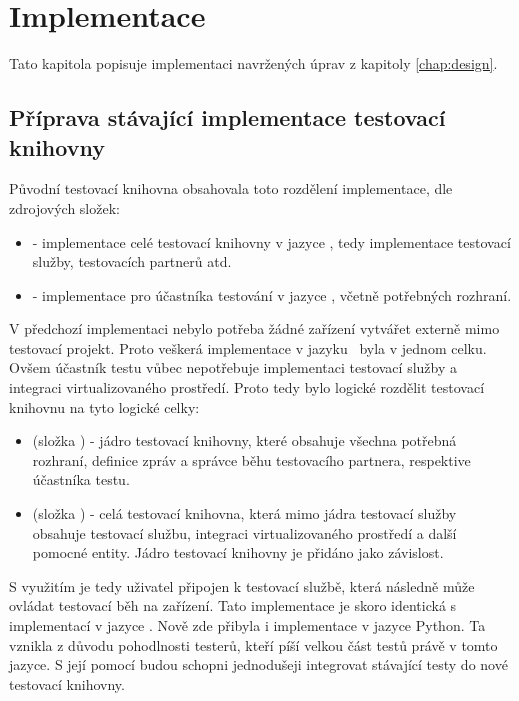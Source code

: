 \chapter{Implementace}\label{chap:implementation}

Tato kapitola popisuje implementaci navržených úprav z kapitoly \ref{chap:design}.


\section{Příprava stávající implementace testovací knihovny}
Původní testovací knihovna obsahovala toto rozdělení implementace, dle zdrojových složek:

\begin{itemize}
    \item {} - implementace celé testovací knihovny v jazyce \csharp, tedy implementace testovací služby, testovacích partnerů atd.
    \item {} - implementace pro účastníka testování v jazyce \cpp, včetně potřebných rozhraní.
\end{itemize}

V předchozí implementaci nebylo potřeba žádné zařízení vytvářet externě mimo testovací projekt. Proto veškerá implementace v jazyku \csharp\, byla v jednom celku. Ovšem účastník testu vůbec nepotřebuje implementaci testovací služby a integraci virtualizovaného prostředí. Proto tedy bylo logické rozdělit testovací knihovnu na tyto logické celky:

\begin{itemize}
    \item {} (složka ) - jádro testovací knihovny, které obsahuje všechna potřebná rozhraní, definice zpráv a správce běhu testovacího partnera, respektive účastníka testu.
    \item {} (složka ) - celá testovací knihovna, která mimo jádra testovací služby obsahuje testovací službu, integraci virtualizovaného prostředí a další pomocné entity. Jádro testovací knihovny je přidáno jako závislost. 
\end{itemize}

S využitím  je tedy uživatel připojen k testovací službě, která následně může ovládat testovací běh na zařízení. Tato implementace je skoro identická s implementací v jazyce \cpp. Nově zde přibyla i implementace v jazyce Python. Ta vznikla z důvodu pohodlnosti testerů, kteří píší velkou část testů právě v tomto jazyce. S její pomocí budou schopni jednodušeji integrovat stávající testy do nové testovací knihovny. 

